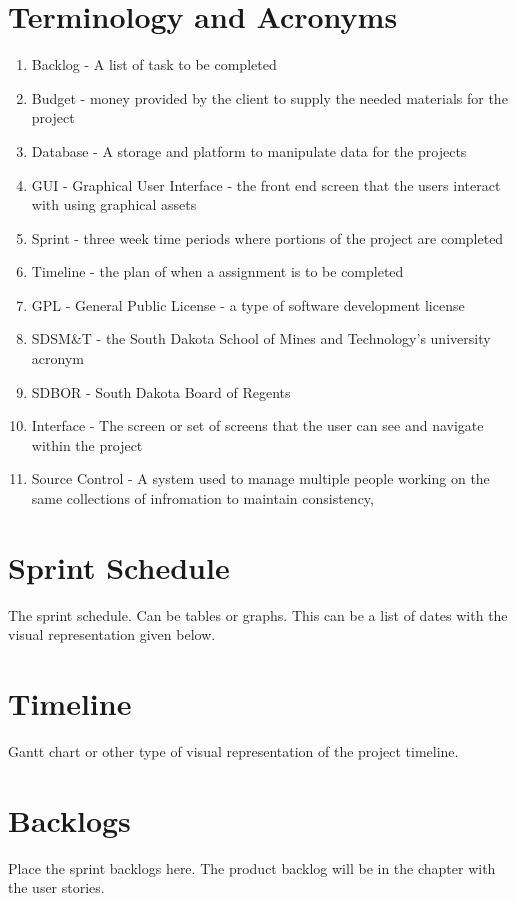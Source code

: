 \section{Terminology and Acronyms}
\begin{enumerate}
\item Backlog - A list of task to be completed
\item Budget - money provided by the client to supply the needed materials for the project
\item Database - A storage and platform to manipulate data for the projects 
\item GUI - Graphical User Interface - the front end screen that the users interact with using graphical assets
\item Sprint - three week time periods where portions of the project are completed
\item Timeline - the plan of when a assignment is to be completed
\item GPL - General Public License - a type of software development license
\item SDSM&T - the South Dakota School of Mines and Technology's university acronym
\item SDBOR - South Dakota Board of Regents
\item Interface - The screen or set of screens that the user can see and navigate within the project
\item Source Control - A system used to manage multiple people working on the same collections of infromation to maintain consistency,  
\end{enumerate}

\section{Sprint Schedule}
The sprint schedule.  Can be tables or graphs.   This can be a list of dates with the visual 
representation given below.

\section{Timeline}
Gantt chart or other type of visual representation of the project timeline.

\section{Backlogs}
Place the sprint backlogs here.    The product backlog will be in the chapter with the user 
stories.   


